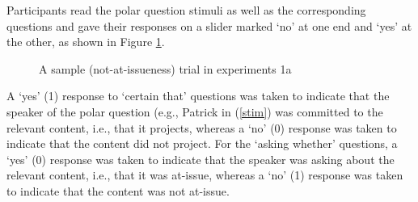 \documentclass[11pt,fleqn]{article}
\newcommand{\6}{\mbox{$[\hspace*{-.6mm}[$}}
\newcommand{\9}{\mbox{$]\hspace*{-.6mm}]$}}
\begin{document}
Participants read the polar question stimuli as well as the corresponding questions and gave their responses on a slider marked `no' at one end and `yes' at the other, as shown in Figure \ref{f-trial-exp1}.  


\begin{figure}[!h]
\begin{center}
\end{center}
\caption{A sample (not-at-issueness) trial in experiments 1a}\label{f-trial-exp1}
\end{figure}

A `yes' (1) response to `certain that' questions was taken to indicate that the speaker of the polar question (e.g., Patrick in (\ref{stim}) was committed to the relevant content, i.e., that it projects, whereas a `no' (0) response was taken to indicate that the content did not project. For the `asking whether' questions, a `yes' (0) response was taken to indicate that the speaker was asking about the relevant content, i.e., that it was at-issue, whereas a `no' (1) response was taken to indicate that the content was not at-issue. 
\end{document}
